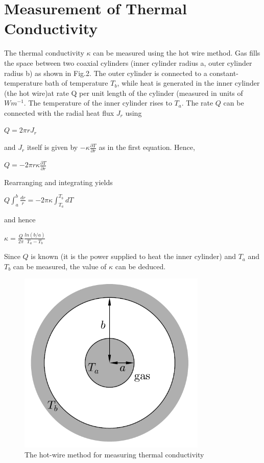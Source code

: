 \documentclass[a4paper, 12pt]{article}%
\begin{document}
\section{Measurement of Thermal Conductivity} 
The thermal conductivity $\kappa$ can be measured using the hot wire method. Gas fills the space between two coaxial cylinders (inner cylinder radius a, outer cylinder radius b) as shown in Fig.2. The outer cylinder is connected to a constant-temperature bath of temperature $T_b$, while heat is generated in the inner cylinder (the hot wire)at rate Q per unit length of the cylinder (measured in units of $ Wm^{-1}$. The temperature of the inner cylinder rises to $T_a$. The rate $Q$ can be connected with the radial heat flux $J_r$ using

\begin{center}
$Q = 2 \pi r J_r$
\end{center}
and $J_r$ itself is given by $-\kappa \frac{\partial T}{\partial r}$ as in the first equation. Hence,
\begin{center}
$Q = {-2} \pi r \kappa \frac{\partial T}{\partial r} $
\end{center}
Rearranging and integrating yields
\begin{center}

$Q \int_{a}^{b} \frac{dr}{r} = -2\pi\kappa\int_{T_a}^{T_b}dT $
\end{center}
and hence
\begin{center}
$\kappa = \frac{Q}{2\pi}\frac{ln(b/a)}{T_a - T_b} $
\end{center}
Since $Q$ is known (it is the power supplied to heat the inner cylinder) and $T_a$ and $T_b$ can be measured, the value of $\kappa$ can be deduced.
\begin{figure}[h]
\begin{center}
\includegraphics[width = 0.8\textwidth]{B3.png}
\caption{The hot-wire method for measuring thermal conductivity}
\end{center}
\end{figure}
\newpage
\end{document}
